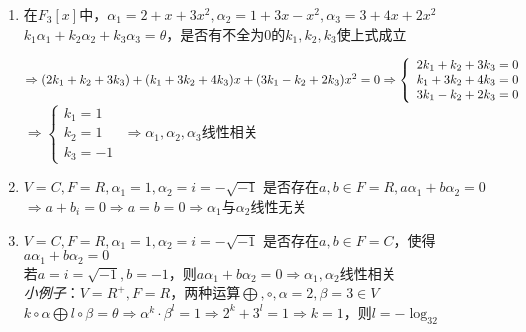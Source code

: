 \begin{property}[线性空间的性质]
\begin{example}
\begin{enumerate}
                \item 在$F_3[x]$中，$\alpha_1 = 2 + x + 3x^2, \alpha_2 = 1 + 3x - x^2, \alpha_3 = 3 + 4x + 2x^2$
                $k_1 \alpha_1 + k_2 \alpha_2 + k_3 \alpha_3 = \theta$，是否有不全为$0$的$k_1, k_2, k_3$使上式成立
                \begin{solutiontitle}
                    $\Rightarrow (2k_1 + k_2 + 3k_3) + (k_1 + 3k_2 + 4k_3)x + (3k_1 - k_2 + 2k_3)x^2 = 0 \\
                    \Rightarrow \left\{
                        \begin{array}{ccc}
                            2k_1 + k_2 + 3k_3 = 0 \\
                            k_1 + 3k_2 + 4k_3 = 0 \\
                            3k_1 - k_2 + 2k_3 = 0
                        \end{array}
                    \right.$
                    $\Rightarrow \left\{
                        \begin{array}{ccc}
                            k_1 = 1 \\
                            k_2 = 1 \\
                            k_3 = -1
                        \end{array}
                    \right.$
                    $\Rightarrow \alpha_1, \alpha_2, \alpha_3$线性相关
                \end{solutiontitle}
                
                \item $V = C, F = R, \alpha_1 = 1, \alpha_2 = i = -\sqrt{-1}$
                是否存在$a, b \in F = R, a\alpha_1 + b\alpha_2 = 0$\\
                $\Rightarrow a + b_i = 0 \Rightarrow a = b = 0 \Rightarrow \alpha_1$与$\alpha_2$线性无关

                \item $V = C, F = R, \alpha_1 = 1, \alpha_2 = i = -\sqrt{-1}$
                是否存在$a, b \in F = C$，使得$a\alpha_1 + b\alpha_2 = 0$\\
                若$a = i = \sqrt{-1}, b = -1$，则$a\alpha_1 + b\alpha_2 = 0 \Rightarrow \alpha_1, \alpha_2$线性相关\\
                \emph{小例子}：$V = R^+, F = R$，两种运算$\bigoplus, \circ, \alpha = 2, \beta = 3 \in V$\\
                $k \circ \alpha \bigoplus l \circ \beta = \theta \Rightarrow \alpha^k \cdot \beta^l = 1 \Rightarrow 2^k + 3^l =1 \Rightarrow k = 1$，则$l = -\log_32$
        \end{enumerate}
    \end{example}


\end{property}
